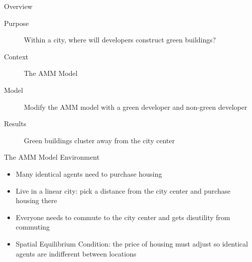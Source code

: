 \documentclass[11pt]{beamer}
\begin{document}
\begin{frame}{Overview}

\begin{description}
	\item[Purpose] Within a city, where will developers construct green buildings?
	\vfill
	
	\item[Context] The AMM Model
	\vfill
	
	\item[Model] Modify the AMM model with a green developer and non-green developer
	\vfill
	
	\item[Results] Green buildings cluster away from the city center
\end{description}

\end{frame}




\begin{frame}{The AMM Model Environment}

\begin{itemize}
	\item Many identical agents need to purchase housing
	
	\vfill
	\item Live in a  linear city: pick a distance from the city center and purchase housing there
	\vspace{.5cm}
	\begin{center}
	\end{center}
	
	\vfill
	\item Everyone needs to commute to the city center and gets disutility from commuting
	\vfill
	
	\item Spatial Equilibrium Condition: the price of housing must adjust so identical agents are indifferent between locations 	
\end{itemize}

\end{frame}
\end{document}
